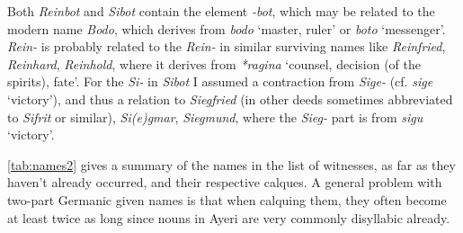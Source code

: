 \documentclass[12pt,paper=a4]{scrartcl}
\newcommand{\fw}[1]{\textit{#1}} %
\begin{document}
Both \fw{Reinbot} and \fw{Sibot} contain the element \fw{-bot}, which may be 
related to the modern name \fw{Bodo}, which derives from \Os{} \fw{bodo} 
`master, ruler' or \Ohg{} \fw{boto} `messenger'. \fw{Rein-} is probably related 
to the \fw{Rein-} in similar surviving names like \fw{Reinfried}, \fw{Reinhard}, 
\fw{Reinhold}, where it derives from \Gmc{} \fw{*ragina} `counsel, decision (of 
the spirits), fate'. For the \fw{Si-} in \fw{Sibot} I assumed a contraction from 
\fw{Sige-} (cf. \Mhg{} \fw{sige} `victory'), and thus a relation to 
\fw{Siegfried} (in other deeds sometimes abbreviated to \fw{Sifrit} or similar), 
\fw{Si(e)gmar}, \fw{Siegmund}, where the \fw{Sieg-} part is from \Ohg{} 
\fw{sigu} `victory'.

\autoref{tab:names2} gives a summary of the names in the list of witnesses, as 
far as they haven't already occurred, and their respective calques. A general 
problem with two-part Germanic given names is that when calquing them, they 
often become at least twice as long since nouns in Ayeri are very commonly 
disyllabic already.
\end{document}
